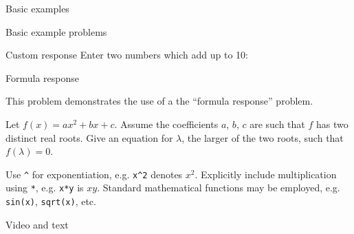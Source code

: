 \begin{edXchapter}{Basic examples}
\begin{edXsequential}{Basic example problems}
\begin{edXvertical}
\begin{edXproblem}{Custom response}
Enter two numbers which add up to 10:

%

\end{edXproblem}

\end{edXvertical}


\begin{edXvertical}


\begin{edXproblem}{Formula response}

This problem demonstrates the use of a the ``formula response'' problem.

Let $f(x) = a x^2 + bx + c$.  Assume the coefficients $a$, $b$, $c$
are such that $f$ has two distinct real roots. Give an equation for
$\lambda$, the larger of the two roots, such that $f(\lambda)=0$.

Use \texttt{^} for exponentiation, e.g. \texttt{x^2} denotes $x^2$.
Explicitly include multiplication using \texttt{*}, e.g. \texttt{x*y} is
$xy$.  Standard mathematical functions may be employed, e.g. \texttt{sin(x)},
\texttt{sqrt(x)}, etc.


\edXinline{$\lambda =$ }
%

\end{edXproblem}

\end{edXvertical}

\end{edXsequential}


\begin{edXsequential}{Video and text}

\begin{edXvertical}


\end{edXvertical}
\end{edXsequential}
\end{edXchapter}
